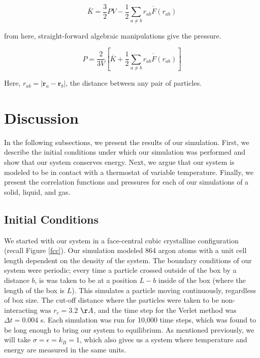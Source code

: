 \documentclass{article}
\begin{document}
\begin{multicols}{2}
\begin{equation}
\bar{K} = \frac{3}{2} PV - \frac{1}{2} \overline{\sum \limits _{a \ne b} r_{ab} F(r_{ab})}
\end{equation}

\noindent from here, straight-forward algebraic manipulations give the pressure.

\begin{equation}
P = \frac{2}{3V} \left [ \bar{K} + \frac{1}{2} \overline{\sum \limits _{a\ne b} r_{ab} F(r_{ab})} \right ]
\end{equation}

\noindent Here, $r_{ab} = |\textbf{r}_a - \textbf{r}_b|$, the distance between any pair of particles.

\section{Discussion}
\label{disc}

In the following subsections, we present the results of our simulation.  First, we describe the initial conditions under which our simulation was performed and show that our system conserves energy.  Next, we argue that our system is modeled to be in contact with a thermostat of variable temperature.  Finally, we present the correlation functions and pressures for each of our simulations of a solid, liquid, and gas.

\subsection{Initial Conditions}

We started with our system in a face-central cubic crystalline configuration (recall Figure \ref{fcc}).  Our simulation modeled  864 argon atoms with a unit cell length dependent on the density of the system.  The boundary conditions of our system were periodic; every time a particle crossed outside of the box by a distance $b$, is was taken to be at a position $L-b$ inside of the box (where the length of the box is $L$).  This simulates a particle moving continuously, regardless of box size.  The cut-off distance where the particles were taken to be non-interacting was $r_c = 3.2$ $\AA$, and the time step for the Verlet method was $\Delta t = 0.004$ s.  Each simulation was run for 10,000 time steps, which was found to be long enough to bring our system to equilibrium.  As mentioned previously, we will take $\sigma=\epsilon=k_B=1$, which also gives us a system where temperature and energy are measured in the same units.  


\end{multicols}
\end{document}
